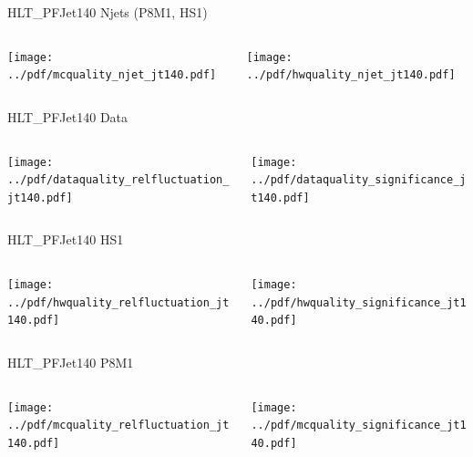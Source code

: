 \documentclass[9pt]{beamer}
\begin{document}
\begin{frame}[t]{HLT\_PFJet140 Njets (P8M1, HS1)}
\begin{columns}[T]
  \begin{column}{.5\textwidth}
  \texttt{[image: ../pdf/mcquality\_njet\_jt140.pdf]}
  \end{column}
  \begin{column}{.5\textwidth}
  \texttt{[image: ../pdf/hwquality\_njet\_jt140.pdf]}
  \end{column}
\end{columns}
\end{frame}

\begin{frame}[t]{HLT\_PFJet140 Data}
\begin{columns}[T]
  \begin{column}{.5\textwidth}
  \texttt{[image: ../pdf/dataquality\_relfluctuation\_jt140.pdf]}
  \end{column}
  \begin{column}{.5\textwidth}
  \texttt{[image: ../pdf/dataquality\_significance\_jt140.pdf]}
  \end{column}
\end{columns}
\end{frame}

\begin{frame}[t]{HLT\_PFJet140 HS1}
\begin{columns}[T]
  \begin{column}{.5\textwidth}
  \texttt{[image: ../pdf/hwquality\_relfluctuation\_jt140.pdf]}
  \end{column}
  \begin{column}{.5\textwidth}
  \texttt{[image: ../pdf/hwquality\_significance\_jt140.pdf]}
  \end{column}
\end{columns}
\end{frame}

\begin{frame}[t]{HLT\_PFJet140 P8M1}
\begin{columns}[T]
  \begin{column}{.5\textwidth}
  \texttt{[image: ../pdf/mcquality\_relfluctuation\_jt140.pdf]}
  \end{column}
  \begin{column}{.5\textwidth}
  \texttt{[image: ../pdf/mcquality\_significance\_jt140.pdf]}
  \end{column}
\end{columns}
\end{frame}
\end{document}

